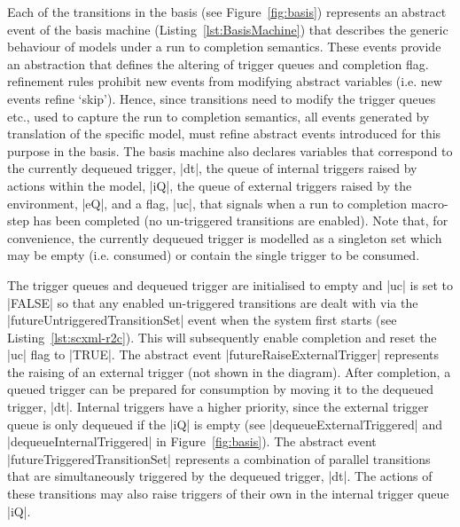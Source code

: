 Each of the transitions in the basis (see Figure~\ref{fig:basis}) represents an abstract event of the basis machine (Listing~\ref{lst:BasisMachine}) that describes the generic behaviour of models under a run to completion semantics.
These events provide an abstraction that defines the altering of trigger queues and completion flag. 
\EventB refinement rules prohibit new events from modifying abstract variables (i.e. new events refine `skip').
Hence, since \SCXML transitions need to modify the trigger queues etc., used to capture the \SCXML run to completion semantics, all events generated by translation of the specific \SCXML model,  must refine abstract events introduced for this purpose in the basis.
The basis machine also declares variables that correspond to the currently dequeued trigger,  |dt|, 
the queue of internal triggers raised by actions within the model, |iQ|, 
the queue of external triggers raised by the environment, |eQ|,
and a flag, |uc|, that signals when a run to completion macro-step has been completed 
(no un-triggered transitions are enabled). 
Note that, for convenience, the currently dequeued trigger is modelled as a singleton set which may be empty (i.e. consumed) or contain the single trigger to be consumed.

The trigger queues and dequeued trigger are initialised to empty and |uc| is set to |FALSE| so that any enabled un-triggered transitions are dealt with via the |futureUntriggeredTransitionSet| event when the system first starts (see Listing~\ref{lst:scxml-r2c}).
This will subsequently enable completion and reset the |uc| flag to |TRUE|.
The abstract event |futureRaiseExternalTrigger| represents the raising  of an external trigger (not shown in the diagram).    
After completion, a queued trigger can be prepared for consumption by moving it to the dequeued trigger, |dt|.
Internal triggers have a higher priority, since the external trigger queue is only dequeued if the |iQ| is empty (see |dequeueExternalTriggered| and |dequeueInternalTriggered| in Figure~\ref{fig:basis}).
The abstract event |futureTriggeredTransitionSet| represents a combination of parallel transitions that are simultaneously triggered by the dequeued trigger, |dt|.
The actions of these transitions may also raise triggers of their own in the internal trigger queue |iQ|.


